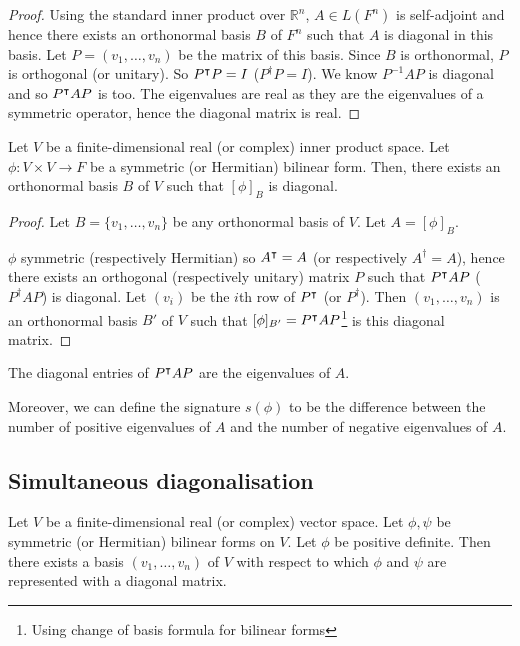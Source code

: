 \begin{proof}
	Using the standard inner product over $\mathbb{R}^n$, $A \in L(F^n)$ is self-adjoint and hence there exists an orthonormal basis $B$ of $F^n$ such that $A$ is diagonal in this basis.
	Let $P = (v_1, \dots, v_n)$ be the matrix of this basis.
	Since $B$ is orthonormal, $P$ is orthogonal (or unitary).
	So $P^\intercal P = I$ ($P^\dagger P = I$).
	We know $P^{-1} A P$ is diagonal and so $P^\intercal A P$ is too.
	The eigenvalues are real as they are the eigenvalues of a symmetric operator, hence the diagonal matrix is real.
\end{proof}

\begin{corollary}
	Let $V$ be a finite-dimensional real (or complex) inner product space.
	Let $\phi \colon V \times V \to F$ be a symmetric (or Hermitian) bilinear form.
	Then, there exists an orthonormal basis $B$ of $V$ such that $[\phi]_B$ is diagonal.
\end{corollary}
\begin{proof}
	Let $B = \{v_1, \dots, v_n\}$ be any orthonormal basis of $V$.
	Let $A =[\phi]_B$.

	$\phi$ symmetric (respectively Hermitian) so $A^\intercal = A$ (or respectively $A^\dagger = A$), hence there exists an orthogonal (respectively unitary) matrix $P$ such that $P^\intercal A P$ ($P^\dagger A P$) is diagonal.
	Let $(v_i)$ be the $i$th row of $P^\intercal$ (or $P^\dagger$).
	Then $(v_1, \dots, v_n)$ is an orthonormal basis $B'$ of $V$ such that $[\phi]_{B'} = P^\intercal A P$\footnote{Using change of basis formula for bilinear forms} is this diagonal matrix.
\end{proof}

\begin{remark}
	The diagonal entries of $P^\intercal A P$ are the eigenvalues of $A$.

	Moreover, we can define the signature $s(\phi)$ to be the difference between the number of positive eigenvalues of $A$ and the number of negative eigenvalues of $A$.
\end{remark}

\subsection{Simultaneous diagonalisation}
\begin{corollary}
	Let $V$ be a finite-dimensional real (or complex) vector space.
	Let $\phi, \psi$ be symmetric (or Hermitian) bilinear forms on $V$.
	Let $\phi$ be positive definite.
	Then there exists a basis $(v_1, \dots, v_n)$ of $V$ with respect to which $\phi$ and $\psi$ are represented with a diagonal matrix.
\end{corollary}

